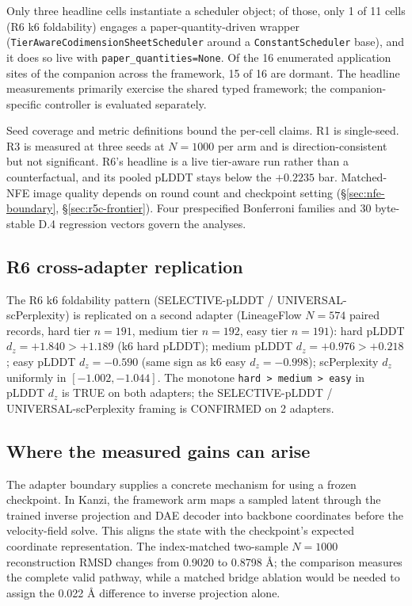\documentclass[journal,twocolumn,final]{IEEEtran}
\begin{document}
Only three headline cells instantiate a scheduler object; of those, only 1 of 11 cells (R6 k6 foldability) engages a paper-quantity-driven wrapper (\texttt{TierAwareCodimensionSheetScheduler} around a \texttt{ConstantScheduler} base), and it does so live with \texttt{paper\_quantities=None}. Of the 16 enumerated application sites of the companion across the framework, 15 of 16 are dormant. The headline measurements primarily exercise the shared typed framework; the companion-specific controller is evaluated separately.

Seed coverage and metric definitions bound the per-cell claims. R1 is single-seed. R3 is measured at three seeds at $N=1000$ per arm and is direction-consistent but not significant. R6's headline is a live tier-aware run rather than a counterfactual, and its pooled pLDDT stays below the $+0.2235$ bar. Matched-NFE image quality depends on round count and checkpoint setting (\S\ref{sec:nfe-boundary}, \S\ref{sec:r5c-frontier}). Four prespecified Bonferroni families and 30 byte-stable D.4 regression vectors govern the analyses.

\subsection{R6 cross-adapter replication}

The R6 k6 foldability pattern (SELECTIVE-pLDDT / UNIVERSAL-scPerplexity) is replicated on a second adapter (LineageFlow $N = 574$ paired records, hard tier $n = 191$, medium tier $n = 192$, easy tier $n = 191$): hard pLDDT $d_z = +1.840 > +1.189$ (k6 hard pLDDT); medium pLDDT $d_z = +0.976 > +0.218$; easy pLDDT $d_z = -0.590$ (same sign as k6 easy $d_z = -0.998$); scPerplexity $d_z$ uniformly in $[-1.002, -1.044]$. The monotone \texttt{hard > medium > easy} in pLDDT $d_z$ is TRUE on both adapters; the SELECTIVE-pLDDT / UNIVERSAL-scPerplexity framing is CONFIRMED on 2 adapters.

\subsection{Where the measured gains can arise}
The adapter boundary supplies a concrete mechanism for using a frozen checkpoint. In Kanzi, the framework arm maps a sampled latent through the trained inverse projection and DAE decoder into backbone coordinates before the velocity-field solve. This aligns the state with the checkpoint's expected coordinate representation. The index-matched two-sample $N=1000$ reconstruction RMSD changes from 0.9020 to 0.8798 \AA{}; the comparison measures the complete valid pathway, while a matched bridge ablation would be needed to assign the 0.022 \AA{} difference to inverse projection alone.
\end{document}
